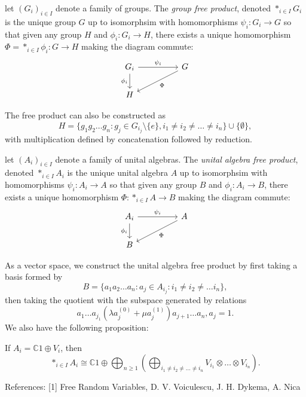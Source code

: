 \documentclass[11pt]{scrartcl}
\newcommand{\C}{\mathbb C}
\newcommand{\1}{\textbf{1}} %
\begin{document}
\begin{definition} let $(G_i)_{i \in I}$ denote a family of groups.  The \textit{group free product}, denoted $*_{i \in I} G_i$ is the unique group $G$ up to isomorphsim with homomorphisms $\psi_{i} : G_i \to G$ so that given any group $H$ and $\phi_i: G_i \to H$, there exists a unique homomorphism $\Phi =  *_{i \in I} \phi_i: G \to H$ making the diagram commute:
\[\begin{tikzcd}
	{G_i} && G \\
	H
	\arrow["{\psi_i}", from=1-1, to=1-3]
	\arrow["{\phi_i}"', from=1-1, to=2-1]
	\arrow["\Phi", from=1-3, to=2-1]
\end{tikzcd}\]
\end{definition}
The free product can also be constructed as 
$$H = \{g_1g_2\dots g_n : g_j \in G_{i_j} \setminus \{e\}, i_1 \ne i_2 \ne \dots \ne i_n\} \cup \{\emptyset\},$$
with multiplication defined by concatenation followed by reduction.  
\begin{definition} let $(A_i)_{i \in I}$ denote a family of unital algebras.  The \textit{unital algebra free product}, denoted $*_{i \in I} A_i$ is the unique unital algebra $A$ up to isomorphsim with homomorphisms $\psi_{i} : A_i \to A$ so that given any group $B$ and $\phi_i: A_i \to B$, there exists a unique homomorphism $\Phi: *_{i \in I} A \to B$ making the diagram commute:
\[\begin{tikzcd}
	{A_i} && A \\
	B
	\arrow["{\psi_i}", from=1-1, to=1-3]
	\arrow["{\phi_i}"', from=1-1, to=2-1]
	\arrow["\Phi", from=1-3, to=2-1]
\end{tikzcd}\]
\end{definition}
As a vector space, we construct the unital algebra free product by first taking a basis formed by 
$$B = \{a_1a_2\dots a_n : a_j \in A_{i_j} : i_1 \ne i_2 \ne \dots i_n\},$$
then taking the quotient with the subspace generated by relations
$$a_1 \dots a_{j_1}(\lambda a_j^{(0)} + \mu a_j^{(1)})a_{j+1} \dots a_n, a_j = 1.$$
We also have the following proposition:
\begin{proposition} If $A_i = \C1 \oplus V_i$, then
$$*_{i \in I} A_i \cong \C1 \oplus \bigoplus_{n \ge 1} \left (\bigoplus_{i_1\ne i_2 \ne \dots \ne i_n} V_{i_1} \otimes \dots \otimes V_{i_n}\right).$$
\end{proposition}






References:
[1] Free Random Variables, D. V. Voiculescu, J. H. Dykema, A. Nica
\end{document}
